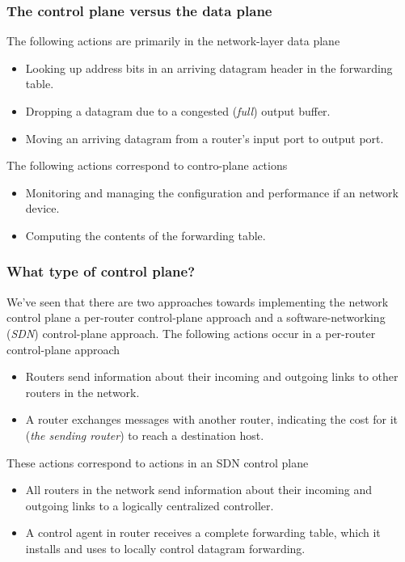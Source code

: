     \subsubsection*{The control plane versus the data plane}
    \noindent The following actions are primarily in the network-layer data plane
    \begin{itemize}
        \item Looking up address bits in an arriving datagram header in the forwarding table.
        \item Dropping a datagram due to a congested (\textit{full}) output buffer.
        \item Moving an arriving datagram from a router's input port to output port.
    \end{itemize}

    \noindent The following actions correspond to contro-plane actions
    \begin{itemize}
        \item Monitoring and managing the configuration and performance if an network device.
        \item Computing the contents of the forwarding table.
    \end{itemize}

    \subsubsection*{What type of control plane?}
    \noindent We've seen that there are two approaches towards implementing the network control plane a per-router control-plane approach and a
    software-networking (\textit{SDN}) control-plane approach. The following actions occur in a per-router control-plane approach
    \begin{itemize}
        \item Routers send information about their incoming and outgoing links to other routers in the network.
        \item A router exchanges messages with another router, indicating the cost for it (\textit{the sending router}) to reach a destination host.
    \end{itemize}

    \noindent These actions correspond to actions in an SDN control plane
    \begin{itemize}
        \item All routers in the network send information about their incoming and outgoing links to a logically centralized controller.
        \item A control agent in router receives a complete forwarding table, which it installs and uses to locally control datagram forwarding.
    \end{itemize}

